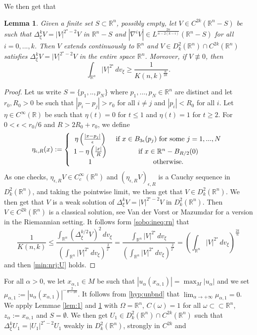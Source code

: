 \documentclass[reqno]{amsart}
\newtheorem{lemma}{Lemma}[section]
\def \rr {\mathbb{R}}
\def \rn {\mathbb{R}^n}
\def \eps {\epsilon}
\def \crit {2^\star}
\def \ua {u_\alpha}
\def \za {z_\alpha}
\def \xaun {x_{\alpha,1}}
\def \maun {\mu_{\alpha,1}}
\begin{document}
We then get that
\begin{lemma}\label{lem:2} Given a finite set $S\subset \rn$, possibly empty, let $V\in C^{2k}(\rn-S)$ be such that $\Delta_\xi^kV=|V|^{\crit-2}V$ in $\rn-S$ and  $|\nabla^iV|\in L^{\frac{2n}{n-2(k-i)}}(\rn-S)$ for all $i=0,...,k$. Then $V$ extends continuously to $\rn$ and $V\in D_k^2(\rn)\cap C^{2k}(\rn)$ satisfies $\Delta_\xi^kV=|V|^{\crit-2}V$ in the entire space $\rn$. Moreover, if $V\not\equiv 0$, then
\begin{equation}\label{min:nrj:U}
\int_{\rn}|V|^{\crit}\, dv_\xi\geq \frac{1}{K(n,k)^{\frac{n}{2k}}}.
\end{equation}
\end{lemma}
\begin{proof} Let us write $S=\{p_1,..,p_N\}$ where $p_1,...,p_N\in\rn$ are distinct and let $r_0, R_0>0$ be such that $|p_i-p_j|>r_0$ for all $i\neq j$ and $|p_i|<R_0$ for all $i$. Let $\eta\in C^\infty(\rr)$ be such that $\eta(t)=0$ for $t\leq 1$ and $\eta(t)=1$ for $t\geq 2$. For $0<\eps<r_0/6$ and $R>2R_0+r_0$, we define
$$\eta_{\eps,R}(x):=\left\{\begin{array}{cc}
\eta\left(\frac{|x-p_j|}{\eps}\right)&\hbox{ if }x\in B_{3\eps}(p_j)\hbox{ for some }j=1,...,N\\
1-\eta\left(\frac{|x|}{R}\right)&\hbox{ if }x\in \rn -  B_{R/2}(0)\\
1&\hbox{ otherwise.}
\end{array}\right.$$
As one checks,  $\eta_{\eps,R}V\in C^\infty_c(\rn)$ and $(\eta_{\eps,R}V)_{\eps,R}$ is a Cauchy sequence in $D_k^2(\rn)$, and taking the pointwise limit, we then get that $V\in D_k^2(\rn)$. We then get that $V$ is a weak solution of $\Delta_\xi^kV=|V|^{\crit-2}V$ in $D_k^2(\rn)$. Then $V\in C^{2k}(\rn)$ is a classical solution, see Van der Vorst \cite{vdv} or Mazumdar \cite{mazumdar:jde} for a version in the Riemannian setting. It follows form \eqref{sobo:ineq:rn} that
\begin{equation*}
\frac{1}{K(n,k)}\leq \frac{\int_{\rn}(\Delta_\xi^{k/2}V)^2\, dv_\xi}{\left(\int_{\rn}|V|^{\crit}\, dv_\xi\right)^{\frac{2}{\crit}}}=\frac{\int_{\rn}|V|^{\crit}\, dv_\xi}{\left(\int_{\rn}|V|^{\crit}\, dv_\xi\right)^{\frac{2}{\crit}}}=\left(\int_{\rn}|V|^{\crit}\, dv_\xi\right)^{\frac{2k}{n}}\end{equation*}
and then \eqref{min:nrj:U} holds.
\end{proof}
For all $\alpha>0$, we let $\xaun\in M$ be such that $|\ua(\xaun)|=\max_M |\ua|$ and we set $\maun:=|\ua(\xaun)|^{-\frac{2}{n-2k}}$. It follows from \eqref{hyp:unbnd} that $\lim_{\alpha\to +\infty}\maun=0$. We apply Lemmae \ref{lem:1} and \ref{lem:2} with $\Omega=\rn$, $C(\omega)=1$ for all $\omega\subset\subset\rn$, $\za:=\xaun$ and $S=\emptyset$. We then get $U_1\in D_k^2(\rn)\cap C^{2k}(\rn)$ such that $\Delta^k_\xi U_1=|U_1|^{\crit-2}U_1$ weakly in $D_k^2(\rn)$, strongly in $C^{2k}$ and 
\end{document}
